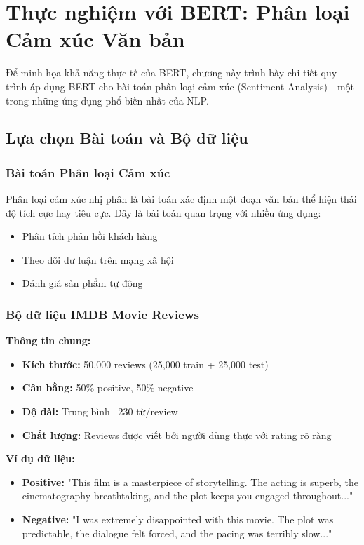 \section{Thực nghiệm với BERT: Phân loại Cảm xúc Văn bản}
\label{sec:thuc_nghiem_bert}
Để minh họa khả năng thực tế của BERT, chương này trình bày chi tiết quy trình áp dụng BERT cho bài toán phân loại cảm xúc (Sentiment Analysis) - một trong những ứng dụng phổ biến nhất của NLP.

\subsection{Lựa chọn Bài toán và Bộ dữ liệu}
\label{ssec:lua_chon_bai_toan_dataset}

\subsubsection{Bài toán Phân loại Cảm xúc}
Phân loại cảm xúc nhị phân là bài toán xác định một đoạn văn bản thể hiện thái độ tích cực hay tiêu cực. Đây là bài toán quan trọng với nhiều ứng dụng:
\begin{itemize}
    \item Phân tích phản hồi khách hàng
    \item Theo dõi dư luận trên mạng xã hội
    \item Đánh giá sản phẩm tự động
\end{itemize}

\subsubsection{Bộ dữ liệu IMDB Movie Reviews}
\textbf{Thông tin chung:}
\begin{itemize}
    \item \textbf{Kích thước:} 50,000 reviews (25,000 train + 25,000 test)
    \item \textbf{Cân bằng:} 50\% positive, 50\% negative
    \item \textbf{Độ dài:} Trung bình ~230 từ/review
    \item \textbf{Chất lượng:} Reviews được viết bởi người dùng thực với rating rõ ràng
\end{itemize}

\textbf{Ví dụ dữ liệu:}
\begin{itemize}
    \item \textbf{Positive:} "This film is a masterpiece of storytelling. The acting is superb, the cinematography breathtaking, and the plot keeps you engaged throughout..."
    \item \textbf{Negative:} "I was extremely disappointed with this movie. The plot was predictable, the dialogue felt forced, and the pacing was terribly slow..."
\end{itemize}

